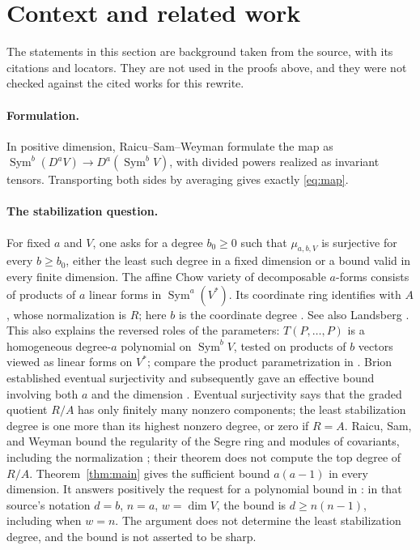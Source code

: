 \documentclass[11pt]{article}
\theoremstyle{definition}
\theoremstyle{remark}
\DeclareMathOperator{\Sym}{Sym}
\begin{document}
\section{Context and related work}\label{sec:context}

The statements in this section are background taken from the source,
with its citations and locators. They are not used in the proofs above, and
they were not checked against the cited works for this rewrite.

\paragraph{Formulation.}
In positive dimension, Raicu--Sam--Weyman \cite[Section~2]{RSW} formulate
the map as $\Sym^b(D^aV)\longrightarrow D^a(\Sym^bV)$, with divided powers
realized as invariant tensors. Transporting both sides by averaging gives
exactly \eqref{eq:map}.

\paragraph{The stabilization question.}
For fixed $a$ and $V$, one asks for a degree $b_0\ge0$ such that
$\mu_{a,b,V}$ is surjective for every $b\ge b_0$, either the least such
degree in a fixed dimension or a bound valid in every finite dimension. The
affine Chow variety of decomposable $a$-forms consists of products of $a$
linear forms in $\Sym^a(V^*)$. Its coordinate ring identifies with $A$,
whose normalization is $R$; here $b$ is the coordinate degree
\cite[Section~2, Theorem~2.3]{RSW}. See also Landsberg
\cite[Section~7.6, Propositions~7.11--7.12]{Landsberg}. This also explains
the reversed roles of the parameters: $T(P,\ldots,P)$ is a homogeneous
degree-$a$ polynomial on $\Sym^bV$, tested on products of $b$ vectors viewed
as linear forms on $V^*$; compare the product parametrization in
\cite[Section~2]{RSW}. Brion established eventual surjectivity
\cite{Brion1993} and subsequently gave an effective bound involving both $a$
and the dimension \cite[Theorem~3.3]{Brion}. Eventual surjectivity says that
the graded quotient $R/A$ has only finitely many nonzero components; the
least stabilization degree is one more than its highest nonzero degree, or
zero if $R=A$. Raicu, Sam, and Weyman bound the regularity of the Segre
ring and modules of covariants, including the normalization
\cite[Theorem~3.9]{RSW}; their theorem does not compute the top degree of
$R/A$. Theorem~\ref{thm:main} gives the sufficient bound $a(a-1)$ in every
dimension. It answers positively the request for a polynomial bound in
\cite[Problem~7.19]{Landsberg}: in that source's notation $d=b$, $n=a$,
$w=\dim V$, the bound is $d\ge n(n-1)$, including when $w=n$. The argument
does not determine the least stabilization degree, and the bound is not
asserted to be sharp.
\end{document}
